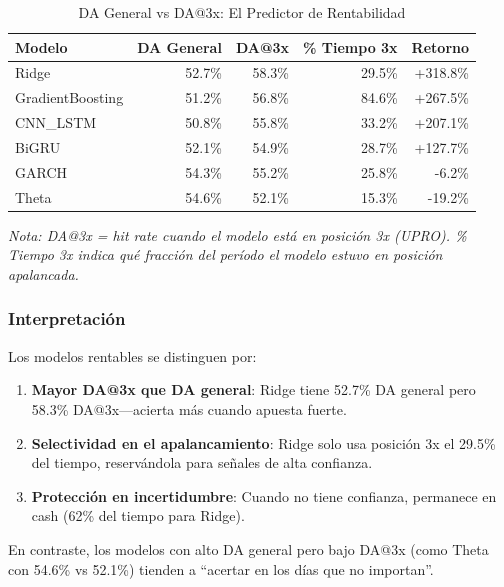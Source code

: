 \begin{table}[htbp]
\centering
\caption{DA General vs DA@3x: El Predictor de Rentabilidad}
\label{tab:da_vs_da3x}
\begin{tabular}{@{}lrrrr@{}}
\toprule
\textbf{Modelo} & \textbf{DA General} & \textbf{DA@3x} & \textbf{\% Tiempo 3x} & \textbf{Retorno} \\
\midrule
Ridge & 52.7\% & 58.3\% & 29.5\% & +318.8\% \\
GradientBoosting & 51.2\% & 56.8\% & 84.6\% & +267.5\% \\
CNN\_LSTM & 50.8\% & 55.8\% & 33.2\% & +207.1\% \\
BiGRU & 52.1\% & 54.9\% & 28.7\% & +127.7\% \\
\midrule
GARCH & 54.3\% & 55.2\% & 25.8\% & -6.2\% \\
Theta & 54.6\% & 52.1\% & 15.3\% & -19.2\% \\
\bottomrule
\end{tabular}

\vspace{0.2cm}
\small\textit{Nota: DA@3x = hit rate cuando el modelo est\'a en posici\'on 3x (UPRO). \% Tiempo 3x indica qu\'e fracci\'on del per\'iodo el modelo estuvo en posici\'on apalancada.}
\end{table}

\subsubsection{Interpretaci\'on}

Los modelos rentables se distinguen por:

\begin{enumerate}
    \item \textbf{Mayor DA@3x que DA general}: Ridge tiene 52.7\% DA general pero 58.3\% DA@3x---acierta m\'as cuando apuesta fuerte.

    \item \textbf{Selectividad en el apalancamiento}: Ridge solo usa posici\'on 3x el 29.5\% del tiempo, reserv\'andola para se\~nales de alta confianza.

    \item \textbf{Protecci\'on en incertidumbre}: Cuando no tiene confianza, permanece en cash (62\% del tiempo para Ridge).
\end{enumerate}

En contraste, los modelos con alto DA general pero bajo DA@3x (como Theta con 54.6\% vs 52.1\%) tienden a ``acertar en los d\'ias que no importan''.

